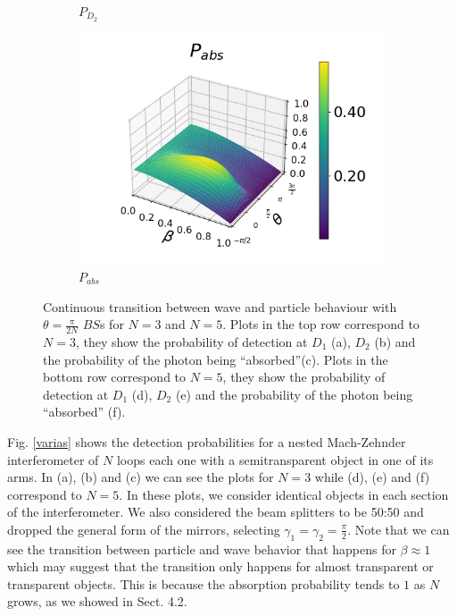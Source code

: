 \documentclass[12pt]{book}
\begin{document}
\begin{figure}[t!]
\begin{subfigure}[b]{0.3\linewidth}
\caption{$P_{D_{2}}$ }
\label{fig:BS1}
\end{subfigure}
\begin{subfigure}[b]{0.3\linewidth}
\includegraphics[width=\linewidth]{images/pabs_5.png}
\caption{$P_{abs}$ }
\label{fig:BS1}
\end{subfigure}
\caption{Continuous transition between wave and particle behaviour with $\theta=\frac{\pi}{2N}$ $BS$s for $N=3$ and $N=5$. Plots in the top row correspond to $N=3$, they show the probability of detection at $D_{1}$ (a), $D_{2}$ (b) and the probability of the photon being ``absorbed''(c). Plots in the bottom row correspond to $N=5$, they show the probability of detection at $D_{1}$ (d),  $D_{2}$ (e) and the probability of the photon being ``absorbed'' (f).}
\label{figvarias2}
\end{figure}

Fig. \ref{varias} shows the detection probabilities for a nested Mach-Zehnder interferometer of $N$ loops each one with a semitransparent object in one of its arms. In (a), (b) and (c) we can see the plots for $N=3$ while (d), (e) and (f) correspond to $N=5$. In these plots, we consider identical objects in each section of the interferometer. We also considered the beam splitters to be 50:50 and dropped the general form of the mirrors, selecting $\gamma_{1}=\gamma_{2}=\frac{\pi}{2}$. Note that we can see the transition between particle and wave behavior that happens for $\beta \approx 1$ which may suggest that the transition only happens for almost transparent or transparent objects. This is because the absorption probability tends to $1$ as $N$ grows, as we showed in Sect. 4.2. 
\end{document}
